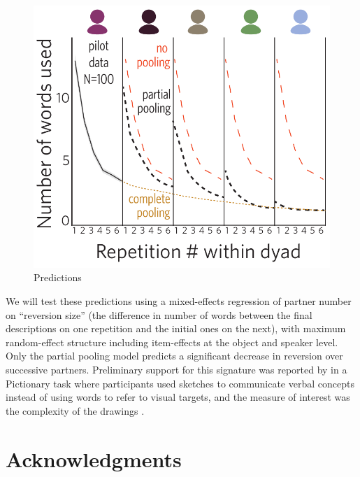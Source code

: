 \documentclass[11pt, floatsintext]{apa6}
\begin{document}
\begin{figure}
\centering
    \includegraphics[scale=.5]{task1_predictions.pdf}
  \caption{Predictions}%
  \label{fig:task1predictions}
\end{figure}
We will test these predictions using a mixed-effects regression of partner number on ``reversion size'' (the difference in number of words between the final descriptions on one repetition and the initial ones on the next), with maximum random-effect structure including item-effects at the object and speaker level.  
Only the partial pooling model predicts a significant decrease in reversion over successive partners. 
Preliminary support for this signature was reported by  in a Pictionary task where participants used sketches to communicate verbal concepts instead of using words to refer to visual targets, and the measure of interest was the  complexity of the drawings \cite<see also>{garrod_conversation_1994}.

\section{\bf Acknowledgments}
\small



\end{document}
